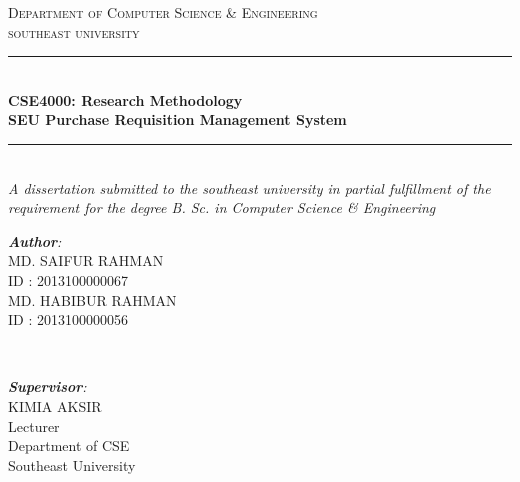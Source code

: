 \documentclass[12pt]{report} %
\begin{document}
\begin{titlepage}

\newcommand{\HRule}{\rule{\linewidth}{0.5mm}} %
\center %
 

\textsc{\Large Department of Computer Science \& Engineering}\\[0.5cm] %
\textsc{\Huge southeast university}\\[1cm] %


\HRule \\[0.4cm]
{ \huge \LARGE \textbf{CSE4000: Research Methodology}}\\ [0.4cm] %
{ {\Large \textbf{SEU Purchase Requisition Management System}}}\\
\HRule \\
 \textit{A dissertation submitted to the southeast university in partial fulfillment of the
requirement for the degree B. Sc. in Computer Science \& Engineering}
\\[1.5cm]

\begin{minipage}{0.5\textwidth}
\begin{flushleft} \large
\emph{\textbf{Author}:}\\
MD. SAIFUR RAHMAN  \\ %
ID : 2013100000067\\
MD. HABIBUR RAHMAN  \\ %
ID : 2013100000056
\end{flushleft}
\end{minipage}
~
\begin{minipage}{0.4\textwidth}
\begin{flushright} \large
\emph{\textbf{Supervisor}:} \\
KIMIA AKSIR  \\%
Lecturer\\
Department of CSE\\
Southeast University
\end{flushright}
\end{minipage}\\[3cm]


\end{titlepage}
\end{document}
